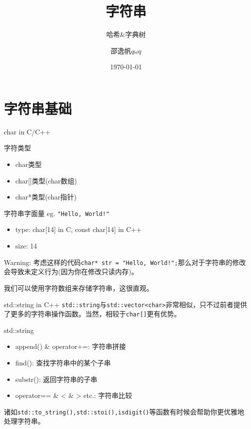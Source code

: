 \documentclass{ldr-simple-gray}
\title{字符串}
\subtitle{哈希\&字典树}
\author{邵逸帆$q\omega q$}
\institute[] {
  23电信基地班\\
  兰州大学算法与程序设计集训队
}
\date{\today}
\begin{document}
  \frame{\titlepage} %
  \section{字符串基础}
  \begin{frame}{char in C/C++}
    \begin{block}{字符类型}
      \begin{itemize}
        \item char类型
        \item char[]类型(char数组)
        \item char*类型(char指针)
      \end{itemize}
    \end{block}
    
    \begin{block}{字符串字面量}
      eg. \texttt{"Hello, World!"}
      \begin{itemize}
        \item type: char[14] in C, const char[14] in C++
        \item size: 14
      \end{itemize}

      Warning: 考虑这样的代码\texttt{char* str = "Hello, World!";}那么对于字符串的修改会导致未定义行为(因为你在修改只读内存)。
    \end{block}

    我们可以使用字符数组来存储字符串，这很直观。
  \end{frame}
  \begin{frame}{std::string in C++}
    \texttt{std::string}与\texttt{std::vector<char>}非常相似，只不过前者提供了更多的字符串操作函数。当然，相较于\texttt{char[]}更有优势。

    \begin{block}{std::string}
      \begin{itemize}
        \item append() \& operator+=: 字符串拼接
        \item find(): 查找字符串中的某个子串
        \item substr(): 返回字符串的子串
        \item operator== \& < \& > etc.: 字符串比较
      \end{itemize}
    \end{block}

    诸如\texttt{std::to\_string(),std::stoi(),isdigit()}等函数有时候会帮助你更优雅地处理字符串。
  \end{frame}
\end{document}
